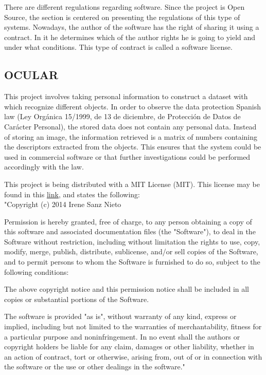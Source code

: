 	There are different regulations regarding software. 
	Since the project is Open Source, the section is centered on presenting the regulations of this type of systems. 
	Nowadays, the author of the software has the right of sharing it using a contract. 
	In it he determines which of the author rights he is going to yield and under what conditions. 
	This type of contract is called a software license. 


	\subsection{OCULAR}

	This project involves taking personal information to construct a dataset with which recognize different objects. 
	In order to observe the data protection Spanish law (Ley Orgánica 15/1999, de 13 de diciembre, de Protección de Datos de Carácter Personal), the stored data does not contain any personal data. 
	Instead of storing an image, the information retrieved is a matrix of numbers containing the descriptors extracted from the objects. 
	This ensures that the system could be used in commercial software or that further investigations could be performed accordingly with the law. 

	This project is being distributed with a MIT License (MIT). 
	This license may be found in this  \href{https://raw.githubusercontent.com/irenesanznieto/ocular/master/LICENSE.md}{\color{blue}\underline {link}}, and states the following: \\

	"Copyright (c) 2014 Irene Sanz Nieto

Permission is hereby granted, free of charge, to any person obtaining a copy of this software and associated documentation files (the "Software"), to deal in the Software without restriction, including without limitation the rights to use, copy, modify, merge, publish, distribute, sublicense, and/or sell copies of the Software, and to permit persons to whom the Software is furnished to do so, subject to the following conditions:

The above copyright notice and this permission notice shall be included in all copies or substantial portions of the Software.

The software is provided "as is", without warranty of any kind, express or implied, including but not limited to the warranties of merchantability, fitness for a particular purpose and noninfringement. In no event shall the authors or copyright holders be liable for any claim, damages or other liability, whether in an action of contract, tort or otherwise, arising from, out of or in connection with the software or the use or other dealings in the software."
\\


